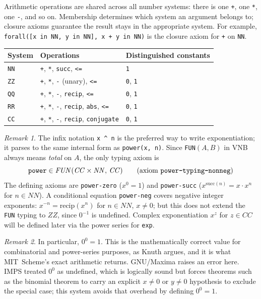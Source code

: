 \documentclass{amsbook}[openany]
\theoremstyle{definition}
\theoremstyle{remark}
\newtheorem{remark}{Remark}[chapter]
\theoremstyle{remark}
\begin{document}
Arithmetic operations are shared across all number systems: there is one
\texttt{+}, one \texttt{*}, one \texttt{-}, and so on.  Membership
determines which system an argument belongs to; closure axioms guarantee
the result stays in the appropriate system.  For example,
\texttt{forall([x in NN, y in NN], x + y in NN)} is the
closure axiom for \texttt{+} on \texttt{NN}.

\begin{center}
\begin{tabular}{lll}
\toprule
System & Operations & Distinguished constants \\
\midrule
\texttt{NN} &
  \texttt{+}, \texttt{*}, \texttt{succ}, \texttt{<=} &
  \texttt{1} \\[3pt]
\texttt{ZZ} &
  \texttt{+}, \texttt{*}, \texttt{-} (unary), \texttt{<=} &
  \texttt{0}, \texttt{1} \\[3pt]
\texttt{QQ} &
  \texttt{+}, \texttt{*}, \texttt{-}, \texttt{recip}, \texttt{<=} &
  \texttt{0}, \texttt{1} \\[3pt]
\texttt{RR} &
  \texttt{+}, \texttt{*}, \texttt{-}, \texttt{recip}, \texttt{abs}, \texttt{<=} &
  \texttt{0}, \texttt{1} \\[3pt]
\texttt{CC} &
  \texttt{+}, \texttt{*}, \texttt{-}, \texttt{recip}, \texttt{conjugate} &
  \texttt{0}, \texttt{1} \\
\bottomrule
\end{tabular}
\end{center}

\begin{remark}\label{remark:27135-34942-842417}
%
The infix notation \texttt{x \^{} n} is the preferred way to write
exponentiation; it parses to the same internal form as
\texttt{power(x, n)}.  Since \texttt{FUN}$(A,B)$ in VNB always means
\emph{total} on $A$, the only typing axiom is
\[
  \texttt{power} \in \mathit{FUN}(\mathit{CC} \times \mathit{NN},\, \mathit{CC})
  \qquad\text{(axiom \texttt{power-typing-nonneg})}
\]
The defining axioms are \texttt{power-zero} ($x^0 = 1$) and
\texttt{power-succ} ($x^{\mathrm{succ}(n)} = x \cdot x^n$ for
$n \in \mathit{NN}$).  A conditional equation \texttt{power-neg}
covers negative integer exponents: $x^{-n} = \mathrm{recip}(x^n)$
for $n \in \mathit{NN}$, $x \neq 0$; but this does not extend the
\texttt{FUN} typing to $\mathit{ZZ}$, since $0^{-1}$ is undefined.
Complex exponentiation $x^z$ for $z \in \mathit{CC}$ will be defined
later via the power series for \texttt{exp}.
%
\end{remark}
%
\begin{remark}\label{remark:27135-34995-146430}
%
In particular, $0^0 = 1$.  This is the mathematically correct value
for combinatorial and power-series purposes, as Knuth argues, and it is
what MIT~Scheme's exact arithmetic returns.  GNU/Maxima raises an error
here.  IMPS treated $0^0$ as undefined, which is logically sound but
forces theorems such as the binomial theorem to carry an explicit
$x \neq 0$ or $y \neq 0$ hypothesis to exclude the special case;
this system avoids that overhead by defining $0^0 = 1$.
%
\end{remark}
\end{document}
